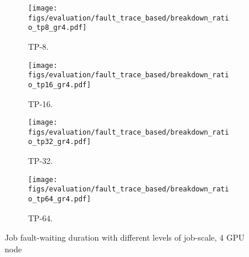 \begin{figure*}[h!t]
    \centering
    \begin{subfigure}[b]{0.23\linewidth}
        \centering
        \texttt{[image: figs/evaluation/fault\_trace\_based/breakdown\_ratio\_tp8\_gr4.pdf]}
        \caption{TP-8.}
        \label{fig:simulation:breakdown-duration:tp8-4gpu}
    \end{subfigure}
    \hspace{2pt}
    \begin{subfigure}[b]{0.23\linewidth}
        \centering
        \texttt{[image: figs/evaluation/fault\_trace\_based/breakdown\_ratio\_tp16\_gr4.pdf]}
        \caption{TP-16.}
        \label{fig:simulation:breakdown-duration:tp16-4gpu}
    \end{subfigure}
    \hspace{2pt}
    \begin{subfigure}[b]{0.23\linewidth}
        \centering
        \texttt{[image: figs/evaluation/fault\_trace\_based/breakdown\_ratio\_tp32\_gr4.pdf]}
        \caption{TP-32.}
        \label{fig:simulation:breakdown-duration:tp32-4gpu}
    \end{subfigure}
    \hspace{2pt}
    \begin{subfigure}[b]{0.23\linewidth}
        \centering
        \texttt{[image: figs/evaluation/fault\_trace\_based/breakdown\_ratio\_tp64\_gr4.pdf]}
        \caption{TP-64.}
        \label{fig:simulation:breakdown-duration:tp64-4gpu}
    \end{subfigure}
    \vspace{-1ex}
    \caption{Job fault-waiting duration with different levels of job-scale, 4 GPU node}
    \label{fig:simulation:breakdown-duration-supple}
\end{figure*}



